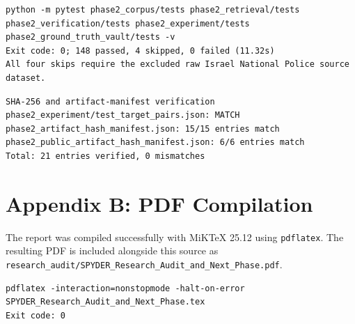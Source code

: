 \documentclass[11pt,a4paper]{article}
\begin{document}
\begin{verbatim}
python -m pytest phase2_corpus/tests phase2_retrieval/tests phase2_verification/tests phase2_experiment/tests phase2_ground_truth_vault/tests -v
Exit code: 0; 148 passed, 4 skipped, 0 failed (11.32s)
All four skips require the excluded raw Israel National Police source dataset.
\end{verbatim}

\begin{verbatim}
SHA-256 and artifact-manifest verification
phase2_experiment/test_target_pairs.json: MATCH
phase2_artifact_hash_manifest.json: 15/15 entries match
phase2_public_artifact_hash_manifest.json: 6/6 entries match
Total: 21 entries verified, 0 mismatches
\end{verbatim}

\section{Appendix B: PDF Compilation}

The report was compiled successfully with MiKTeX 25.12 using \texttt{pdflatex}. The resulting PDF is included alongside this source as \texttt{research\_audit/SPYDER\_Research\_Audit\_and\_Next\_Phase.pdf}.

\begin{verbatim}
pdflatex -interaction=nonstopmode -halt-on-error SPYDER_Research_Audit_and_Next_Phase.tex
Exit code: 0
\end{verbatim}
\end{document}
